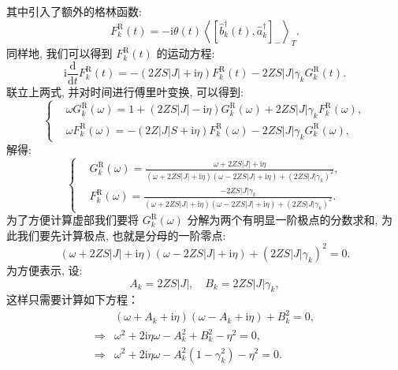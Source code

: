 其中引入了额外的格林函数:
\begin{equation}
F_{k}^\mathrm{R}(t)=-\mathrm{i} \theta(t)\left\langle\left[ \hat b_{k}^{\dagger}(t), \hat{a}_{k}^{\dagger}\right]_-\right\rangle_{T} .
\end{equation}
同样地, 我们可以得到 $F_{k}^\mathrm{R}(t)$ 的运动方程:
\begin{equation}
\mathrm{i} \frac{\mathrm{d}}{\mathrm{d} t} F_{k}^\mathrm{R}(t)=-(2 Z S|J|+\mathrm{i} \eta) F_{k}^\mathrm{R}(t)-2 Z S|J| \gamma_{k} G_{k}^\mathrm{R}(t).
\end{equation}
联立上两式, 并对时间进行傅里叶变换, 可以得到:
\begin{equation}
\left\{\begin{aligned}
& \omega G_{k}^\mathrm{R}(\omega)=1+(2 Z S|J|-\mathrm{i} \eta) G_{k}^\mathrm{R}(\omega)+2 Z S|J| \gamma_{k} F_{k}^\mathrm{R}(\omega), \\
& \omega F_{k}^\mathrm{R}(\omega)=-(2 Z|J| S+\mathrm{i} \eta) F_{k}^\mathrm{R}(\omega)-2 Z S|J| \gamma_{k} G_{k}^\mathrm{R}(\omega),
\end{aligned}\right.
\end{equation}
解得:
\begin{equation}
\left\{\begin{aligned}
& G_{k}^\mathrm{R}(\omega)=\frac{\omega+2 Z S|J|+\mathrm{i} \eta}{(\omega+2 Z S|J|+\mathrm{i} \eta)(\omega-2 Z S|J|+\mathrm{i} \eta)+\left(2 Z S|J| \gamma_{k}\right)^{2}},\\
& F_{k}^\mathrm{R}(\omega)=\frac{-2 Z S|J| \gamma_{k}}{(\omega+2 Z S|J|+\mathrm{i} \eta)(\omega-2 Z S|J|+\mathrm{i} \eta)+\left(2 Z S|J| \gamma_{k}\right)^{2}}.
\end{aligned}\right.
\end{equation}
为了方便计算虚部我们要将 $G_{k}^\mathrm{R}(\omega)$ 分解为两个有明显一阶极点的分数求和, 为此我们要先计算极点, 也就是分母的一阶零点:
\begin{equation}
(\omega+2 Z S|J|+\mathrm{i} \eta)(\omega-2 Z S|J|+\mathrm{i} \eta)+\left(2 Z S|J| \gamma_{k}\right)^{2}=0.
\end{equation}
为方便表示, 设:
\begin{equation}
A_{k}=2 Z S|J|, \quad B_{k}=2 Z S|J| \gamma_{k},
\end{equation}
这样只需要计算如下方程：
\begin{align}
&\left(\omega+A_{k}+\mathrm{i} \eta\right)\left(\omega-A_{k}+\mathrm{i} \eta\right)+B_{k}^{2}=0, \nonumber\\
\Rightarrow &\omega^{2}+2 \mathrm{i} \eta \omega-A_{k}^{2}+B_{k}^{2}-\eta^{2}=0 ,\nonumber\\
\Rightarrow &\omega^{2}+2 \mathrm{i} \eta \omega-A_{k}^{2}\left(1-\gamma_{k}^{2}\right)-\eta^{2}=0 .
\end{align}
